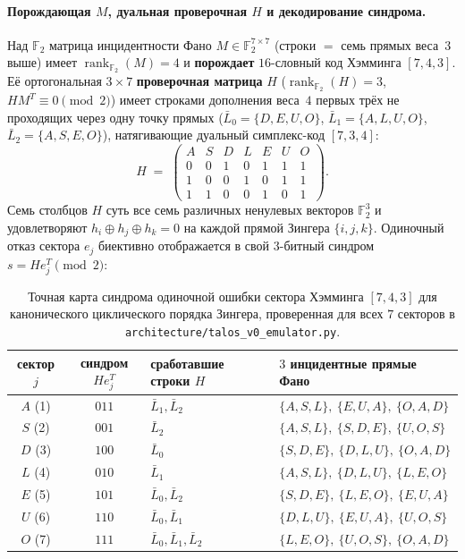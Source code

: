 \paragraph{Порождающая $M$, дуальная проверочная $H$ и декодирование синдрома.}
Над $\mathbb{F}_2$ матрица инцидентности Фано $M\in\mathbb{F}_2^{7\times 7}$
(строки $=$ семь прямых веса~$3$ выше) имеет
$\operatorname{rank}_{\mathbb{F}_2}(M)=4$ и \textbf{порождает} $16$-словный код
Хэмминга $[7,4,3]$. Её ортогональная $3\times 7$ \textbf{проверочная матрица}
$H$ ($\operatorname{rank}_{\mathbb{F}_2}(H)=3$, $HM^T\equiv 0\pmod 2$) имеет
строками дополнения веса~$4$ первых трёх не проходящих через одну точку прямых
($\bar{L}_0=\{D,E,U,O\}$, $\bar{L}_1=\{A,L,U,O\}$, $\bar{L}_2=\{A,S,E,O\}$),
натягивающие дуальный симплекс-код $[7,3,4]$:
\[
H \;=\;
\left(\begin{array}{ccccccc}
A & S & D & L & E & U & O \\ \hline
0 & 0 & 1 & 0 & 1 & 1 & 1 \\
1 & 0 & 0 & 1 & 0 & 1 & 1 \\
1 & 1 & 0 & 0 & 1 & 0 & 1
\end{array}\right).
\]
Семь столбцов $H$ суть все семь различных ненулевых векторов $\mathbb{F}_2^3$ и
удовлетворяют $h_i\oplus h_j\oplus h_k = 0$ на каждой прямой Зингера $\{i,j,k\}$.
Одиночный отказ сектора $e_j$ биективно отображается в свой $3$-битный синдром
$s = He_j^T\pmod 2$:

\begin{table}[H]
\centering\small
\begin{tabular}{@{}ccll@{}}
\toprule
сектор $j$ & синдром $He_j^T$ & сработавшие строки $H$ & $3$ инцидентные прямые Фано \\
\midrule
$A$ (1) & $011$ & $\bar{L}_1,\bar{L}_2$ & $\{A,S,L\},\ \{E,U,A\},\ \{O,A,D\}$ \\
$S$ (2) & $001$ & $\bar{L}_2$ & $\{A,S,L\},\ \{S,D,E\},\ \{U,O,S\}$ \\
$D$ (3) & $100$ & $\bar{L}_0$ & $\{S,D,E\},\ \{D,L,U\},\ \{O,A,D\}$ \\
$L$ (4) & $010$ & $\bar{L}_1$ & $\{A,S,L\},\ \{D,L,U\},\ \{L,E,O\}$ \\
$E$ (5) & $101$ & $\bar{L}_0,\bar{L}_2$ & $\{S,D,E\},\ \{L,E,O\},\ \{E,U,A\}$ \\
$U$ (6) & $110$ & $\bar{L}_0,\bar{L}_1$ & $\{D,L,U\},\ \{E,U,A\},\ \{U,O,S\}$ \\
$O$ (7) & $111$ & $\bar{L}_0,\bar{L}_1,\bar{L}_2$ & $\{L,E,O\},\ \{U,O,S\},\ \{O,A,D\}$ \\
\bottomrule
\end{tabular}
\caption{Точная карта синдрома одиночной ошибки сектора Хэмминга $[7,4,3]$ для
канонического циклического порядка Зингера, проверенная для всех $7$ секторов в
\texttt{architecture/talos\_v0\_emulator.py}.}
\end{table}

